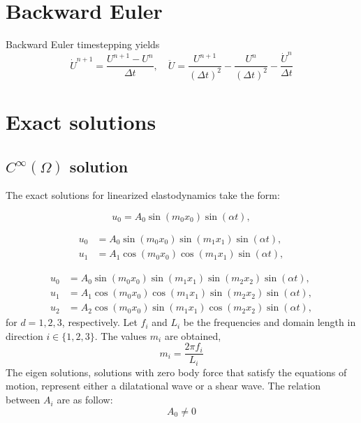 \documentclass[12pt]{article}
\begin{document}
\section{Backward Euler}

Backward Euler timestepping yields
\begin{equation}
\dot{U}^{n+1} = \frac{U^{n+1} - U^n}{\Delta t}, 
\quad 
\ddot{U} = \frac{U^{n+1}}{(\Delta t)^2} - \frac{U^n}{(\Delta t)^2} - \frac{\dot{U}^n}{\Delta t}
\end{equation}


\section{Exact solutions}


\subsection{$C^\infty(\Omega)$ solution}

The exact solutions for linearized elastodynamics take the form:

\begin{equation}
u_0 = A_0 \sin (m_0 x_0) \sin (\alpha t),
\end{equation}

\begin{subequations}
\begin{align}
u_0 &= A_0 \sin (m_0 x_0) \sin (m_1 x_1) \sin (\alpha t), \\
u_1 &= A_1 \cos (m_0 x_0) \cos (m_1 x_1) \sin (\alpha t), 
\end{align}
\end{subequations}

\begin{subequations}
\begin{align}
u_0 &= A_0 \sin (m_0 x_0) \sin (m_1 x_1) \sin (m_2 x_2) \sin (\alpha t), \\
u_1 &= A_1 \cos (m_0 x_0) \cos (m_1 x_1) \sin (m_2 x_2) \sin (\alpha t), \\
u_2 &= A_2 \cos (m_0 x_0) \sin (m_1 x_1) \cos (m_2 x_2) \sin (\alpha t), 
\end{align}
\end{subequations}
%
for $d = 1, 2, 3$, respectively. Let $f_i$ and $L_i$ be the frequencies and domain length in direction $i \in \{1, 2, 3\}$. The values $m_i$ are obtained,
%
\begin{equation}
m_i = \frac{2 \pi f_i}{L_i}
\end{equation}
% 
The eigen solutions, solutions with zero body force that satisfy the equations of motion, represent either a dilatational wave or a shear wave. The relation between $A_i$ are as follow:
%
\begin{equation}
A_0 \neq 0
\end{equation}
\end{document}
